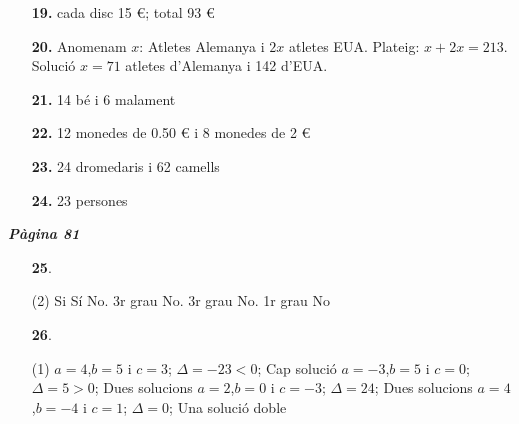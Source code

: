 \documentclass[a4paper, pdf, twoside]{book}
\begin{document}
\begin{multicols}{2}
\begin{enumerate}
\vspace{0.25cm}
\item[\fontfamily{phv}\selectfont\color{blue}\textbf{19. }]  \scalebox{0.6}{\simbolclau } 
cada disc 15 \euro {}; total 93 \euro {}
\vspace{0.25cm}
\item[\fontfamily{phv}\selectfont\color{blue}\textbf{20. }] 
Anomenam $x$: Atletes Alemanya i $2x$ atletes EUA. Plateig: $x+2x=213$. Solució $x=71$ atletes d'Alemanya i 142 d'EUA.
\vspace{0.25cm}
\item[\fontfamily{phv}\selectfont\color{blue}\textbf{21. }]  \scalebox{0.6}{\simbolclau } 
14 bé i 6 malament
\vspace{0.25cm}
\item[\fontfamily{phv}\selectfont\color{blue}\textbf{22. }]  \scalebox{0.6}{\simbolclau } 
12 monedes de 0.50 \euro {} i 8 monedes de 2 \euro {}
\vspace{0.25cm}
\item[\fontfamily{phv}\selectfont\color{blue}\textbf{23. }]  \scalebox{0.6}{\simbolclau } 
24 dromedaris i 62 camells
\vspace{0.25cm}
\item[\fontfamily{phv}\selectfont\color{blue}\textbf{24. }]  \scalebox{0.6}{\simbolclau } 
23 persones
 \end{enumerate}
\vspace{0.3cm}


{\textbf{\em Pàgina 81}} \hrulefill
\begin{enumerate}
\vspace{0.25cm}



 \item[\fontfamily{phv}\selectfont\color{blue}\textbf{25}. ] 
 \begin{tasks}[column-sep=1em, item-indent=1.3333em](2)
	 \task Si
	 \task Sí
	 \task No. 3r grau
	 \task No. 3r grau
	 \task No. 1r grau
	 \task No
\end{tasks}
 \end{enumerate}
\begin{enumerate}
\vspace{0.25cm}



 \item[\fontfamily{phv}\selectfont\color{blue}\textbf{26}. ] 
 \begin{tasks}[column-sep=1em, item-indent=1.3333em](1)
	 \task*  $a=4$,\;$b=5$ i $c=3$; $\Delta =-23<0$; Cap solució
	 \task* $a=-3$,\;$b=5$ i $c=0$; $\Delta =5>0$; Dues solucions
	 \task* $a=2$,\;$b=0$ i $c=-3$; $\Delta =24$; Dues solucions
	 \task* $a=4$,\;$b=-4$ i $c=1$; $\Delta =0$; Una solució doble
\end{tasks}
 \end{enumerate}
\vspace{0.3cm}


\end{multicols}
\end{document}
